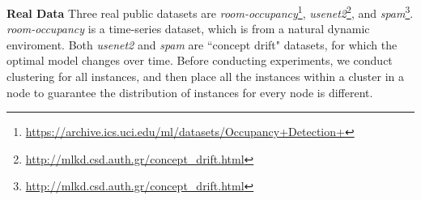 \documentclass{article}
\begin{document}
\textbf{Real Data}
Three real public datasets are \textit{room-occupancy}\footnote{\url{https://archive.ics.uci.edu/ml/datasets/Occupancy+Detection+}},  \textit{usenet2}\footnote{\url{http://mlkd.csd.auth.gr/concept_drift.html}}, and \textit{spam}\footnote{\url{http://mlkd.csd.auth.gr/concept_drift.html}}. \textit{room-occupancy} is a time-series dataset, which is from a natural dynamic enviroment. Both \textit{usenet2} and \textit{spam} are  ``concept drift" \citep{Katakis:2010:TR} datasets, for which the optimal model changes over time. Before conducting experiments, we conduct clustering for all instances, and then place all the instances within a cluster in a node to guarantee the distribution of instances for every node is different.  

\end{document}
